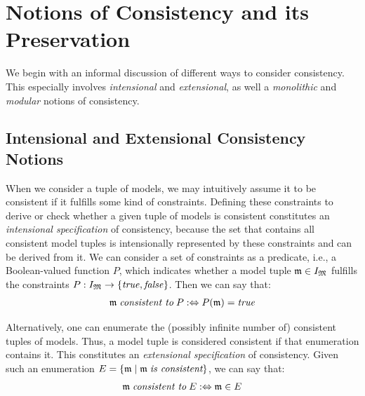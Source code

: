 \section{Notions of Consistency and its Preservation}
\label{chap:correctness:notions_consistency}

We begin with an informal discussion of different ways to consider consistency. This especially involves \emph{intensional} and \emph{extensional}, as well a \emph{monolithic} and \emph{modular} notions of consistency.

\subsection{Intensional and Extensional Consistency Notions}
\label{chap:correctness:notions_consistency:intensional_extensional}

When we consider a tuple of models, we may intuitively assume it to be consistent if it fulfills some kind of constraints.
Defining these constraints to derive or check whether a given tuple of models is consistent constitutes an \emph{intensional specification} of consistency, because the set that contains all consistent model tuples is intensionally represented by these constraints and can be derived from it.
We can consider a set of constraints as a predicate, i.e., a Boolean-valued function $P$, which indicates whether a model tuple $\modeltuple{m} \in \metamodeltupleinstanceset{M}$ fulfills the constraints $P: \metamodeltupleinstanceset{M} \rightarrow \setted{\truemath, \falsemath}$. Then we can say that:
\begin{align*}
    \modeltuple{m} \consistenttomath P \equivalentperdefinition P(\modeltuple{m}) = \truemath
\end{align*}

Alternatively, one can enumerate the (possibly infinite number of) consistent tuples of models.
Thus, a model tuple is considered consistent if that enumeration contains it.
This constitutes an \emph{extensional specification} of consistency.
Given such an enumeration $E = \setted{\modeltuple{m} \mid \modeltuple{m} \mathtextspacebefore{is consistent}}$, we can say that:
\begin{align*}
    \modeltuple{m} \consistenttomath E \equivalentperdefinition \modeltuple{m} \in E
\end{align*}

